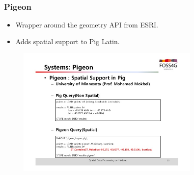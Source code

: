 \documentclass[hyperref={pdfpagelabels=true}]{beamer}
\begin{document}
\begin{frame}
\frametitle{Pigeon}
    \begin{itemize}
    \item<1->Wrapper around the geometry API from ESRI.
    \item<1->Adds spatial support to Pig Latin.
  \end{itemize}  
      \begin{figure}  
	\includegraphics[width=0.8\textwidth]{pigeon.jpg}
       \end{figure}  
\end{frame}
\end{document}
